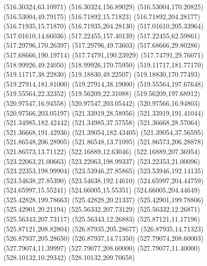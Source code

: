 {(516.30324,63.10971) (516.30324,156.89029) (516.53004,170.20825) (516.53004,49.79175) (516.71892,15.71823) (516.71892,204.28177) (516.71935,15.71870) (516.71935,204.28130)
(517.01610,205.33964) (517.01610,14.66036) (517.22455,157.40139) (517.22455,62.59861) (517.29796,170.26397) (517.29796,49.73603) (517.68666,29.80286) (517.68666,190.19714)
(517.74791,190.23929) (517.74791,29.76071) (518.99926,49.24050) (518.99926,170.75950) (519.11717,181.77170) (519.11717,38.22830) (519.18830,49.22507) (519.18830,170.77493)
(519.27914,181.81000) (519.27914,38.19000) (519.55564,197.67648) (519.55564,22.32352) (519.56209,22.31088) (519.56209,197.68912) (520.97547,16.94558) (520.97547,203.05442)
(520.97566,16.94803) (520.97566,203.05197) (521.33919,28.58956) (521.33919,191.41044) (521.34985,182.42442) (521.34985,37.57558) (521.36668,28.57064) (521.36668,191.42936)
(521.39054,182.43405) (521.39054,37.56595) (521.86548,206.28905) (521.86548,13.71095) (521.86573,206.28878) (521.86573,13.71122) (522.16889,12.63046) (522.16889,207.36954)
(523.22063,21.00663) (523.22063,198.99337) (523.22353,21.00096) (523.22353,198.99904) (523.53946,27.85865) (523.53946,192.14135) (523.54638,27.85390) (523.54638,192.14610)
(524.65997,204.44759) (524.65997,15.55241) (524.66005,15.55351) (524.66005,204.44649) (525.42828,199.78663) (525.42828,20.21337) (525.42901,199.78806) (525.42901,20.21194)
(525.56332,207.73129) (525.56332,12.26871) (525.56343,207.73117) (525.56343,12.26883) (525.87121,11.17196) (525.87121,208.82804) (526.87935,205.28677) (526.87935,14.71323)
(526.87937,205.28650) (526.87937,14.71350) (527.79074,208.60003) (527.79074,11.39997) (527.79077,208.60000) (527.79077,11.40000) (528.10132,10.29342) (528.10132,209.70658)
}
\def\SpectrumInducedCoordinates{%
(189.17094,155.95467) (189.17094,64.04533) (207.73583,154.85838) (207.73583,65.14162) (226.68433,154.03304) (226.68433,65.96696) (245.90750,153.48165) (245.90750,66.51835)
(265.29587,153.20631) (265.29587,66.79369) (284.73925,153.20803) (284.73925,66.79197) (304.12715,153.48677) (304.12715,66.51323) (323.34937,154.04144) (323.34937,65.95856)
(342.29652,154.86990) (342.29652,65.13010) (360.85983,155.96919) (360.85983,64.03081)
}
